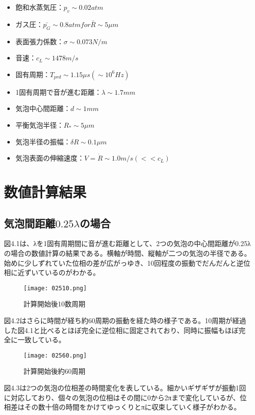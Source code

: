 \documentclass[11pt,a4j]{jreport}
\begin{document}
\begin{itemize}
  \item 飽和水蒸気圧：$p_{v} \sim 0.02atm$
  \item ガス圧：$\bar{p_{G}} \sim 0.8atm for \bar{R} \sim 5\mu m$
  \item 表面張力係数：$\sigma \sim 0.073N/m$
  \item 音速：$c_{L} \sim 1478m/s$
  \item 固有周期：$T_{prd} \sim 1.15\mu s(\sim 10^6Hz)$
  \item 1固有周期で音が進む距離：$\lambda \sim 1.7mm$
  \item 気泡中心間距離：$d \sim 1mm$
  \item 平衡気泡半径：$R_{*} \sim 5\mu m$
  \item 気泡半径の振幅：$\delta R \sim 0.1\mu m$
  \item 気泡表面の伸縮速度：$V=\dot{R} \sim 1.0m/s(<<c_{L})$
\end{itemize}
%
\section{数値計算結果}
\subsection{気泡間距離$0.25\lambda$の場合}
図4.1は、λを1固有周期間に音が進む距離として、2つの気泡の中心間距離が0.25λの場合の数値計算の結果である。横軸が時間、縦軸が二つの気泡の半径である。始めに少しずれていた位相の差が広がっゆき、10回程度の振動でだんだんと逆位相に近ずいているのがわかる。

\begin{figure}[tbh]
\centering
\texttt{[image: 02510.png]}
\caption{計算開始後10数周期}
\label{fig:02510}
\end{figure}

図4.2はさらに時間が経ち約60周期の振動を経た時の様子である。10周期が経過した図4.1と比べるとほぼ完全に逆位相に固定されており、同時に振幅もほぼ完全に一致している。

\begin{figure}[tbh]
\centering
\texttt{[image: 02560.png]}
\caption{計算開始後約60周期}
\label{fig:02560}
\end{figure}

図4.3は2つの気泡の位相差の時間変化を表している。細かいギザギザが振動1回に対応しており、個々の気泡の位相はその間に0から2πまで変化しているが、位相差はその数十倍の時間をかけてゆっくりとπに収束していく様子がわかる。
\end{document}
